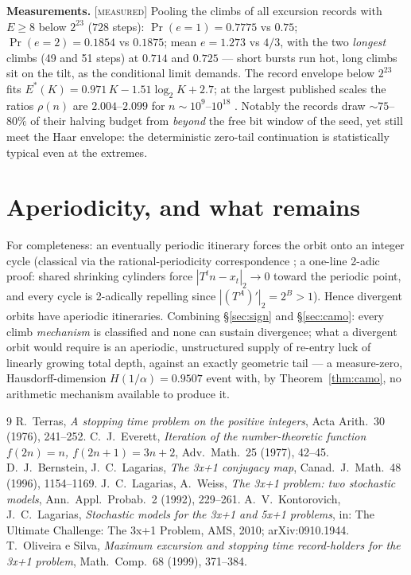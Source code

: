 \documentclass[11pt]{article}
\theoremstyle{definition}
\newcommand{\MEASURED}{\textup{[\textsc{measured}]}}
\begin{document}
\noindent\textbf{Measurements.} \MEASURED\;
Pooling the climbs of all excursion records with $E\ge 8$ below $2^{23}$
($728$ steps): $\Pr(e{=}1)=0.7775$ vs $0.75$; $\Pr(e{=}2)=0.1854$ vs
$0.1875$; mean $e=1.273$ vs $4/3$, with the two \emph{longest} climbs (49 and
51 steps) at $0.714$ and $0.725$ --- short bursts run hot, long climbs sit on
the tilt, as the conditional limit demands. The record envelope below
$2^{23}$ fits $E^{*}(K)=0.971\,K-1.51\log_2 K+2.7$; at the largest published
scales the ratios $\rho(n)$ are $2.004$--$2.099$ for $n\sim
10^{9}$--$10^{18}$ \cite{OeS,KL-survey}. Notably the records draw
$\sim\!75$--$80\%$ of their halving budget from \emph{beyond} the free bit
window of the seed, yet still meet the Haar envelope: the deterministic
zero-tail continuation is statistically typical even at the extremes.

\section{Aperiodicity, and what remains}
For completeness: an eventually periodic itinerary forces the orbit onto an
integer cycle (classical via the rational-periodicity correspondence
\cite{Terras,Everett,BL}; a one-line 2-adic proof: shared shrinking cylinders
force $|T^{t}n-x_t|_2\to0$ toward the periodic point, and every cycle is
2-adically repelling since $|(T^{A})'|_2=2^{B}>1$). Hence divergent orbits
have aperiodic itineraries. Combining \S\ref{sec:sign} and
\S\ref{sec:camo}: every climb \emph{mechanism} is classified and none can
sustain divergence; what a divergent orbit would require is an aperiodic,
unstructured supply of re-entry luck of linearly growing total depth, against
an exactly geometric tail --- a measure-zero, Hausdorff-dimension
$H(1/\alpha)=0.9507$ event with, by Theorem~\ref{thm:camo}, no arithmetic
mechanism available to produce it.

\begin{thebibliography}{9}
 R.~Terras, \emph{A stopping time problem on the positive
integers}, Acta Arith.\ 30 (1976), 241--252.
 C.~J.~Everett, \emph{Iteration of the number-theoretic
function $f(2n)=n$, $f(2n+1)=3n+2$}, Adv.\ Math.\ 25 (1977), 42--45.
 D.~J.~Bernstein, J.~C.~Lagarias, \emph{The 3x+1 conjugacy map},
Canad.\ J.\ Math.\ 48 (1996), 1154--1169.
 J.~C.~Lagarias, A.~Weiss, \emph{The 3x+1 problem: two stochastic
models}, Ann.\ Appl.\ Probab.\ 2 (1992), 229--261.
 A.~V.~Kontorovich, J.~C.~Lagarias, \emph{Stochastic models
for the 3x+1 and 5x+1 problems}, in: The Ultimate Challenge: The 3x+1 Problem,
AMS, 2010; arXiv:0910.1944.
 T.~Oliveira e Silva, \emph{Maximum excursion and stopping time
record-holders for the 3x+1 problem}, Math.\ Comp.\ 68 (1999), 371--384.
\end{thebibliography}
\end{document}
